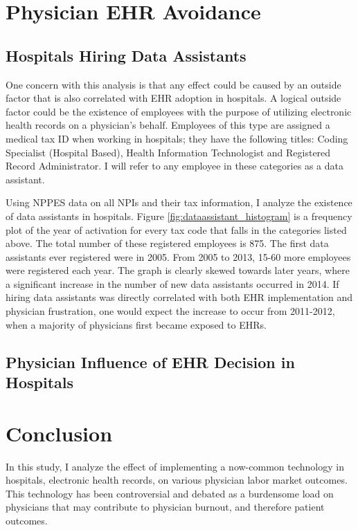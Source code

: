 \documentclass[11pt]{article}
\begin{document}
\section{Physician EHR Avoidance}

\subsection{Hospitals Hiring Data Assistants}\label{sec:dataass}

One concern with this analysis is that any effect could be caused by an outside factor that is also correlated with EHR adoption in hospitals. A logical outside factor could be the existence of employees with the purpose of utilizing electronic health records on a physician's behalf. Employees of this type are assigned a medical tax ID when working in hospitals; they have the following titles: Coding Specialist (Hospital Based), Health Information Technologist and Registered Record Administrator. I will refer to any employee in these categories as a data assistant. 

Using NPPES data on all NPIs and their tax information, I analyze the existence of data assistants in hospitals. Figure \ref{fig:dataassistant_histogram} is a frequency plot of the year of activation for every tax code that falls in the categories listed above. The total number of these registered employees is 875. The first data assistants ever registered were in 2005. From 2005 to 2013, 15-60 more employees were registered each year. The graph is clearly skewed towards later years, where a significant increase in the number of new data assistants occurred in 2014. If hiring data assistants was directly correlated with both EHR implementation and physician frustration, one would expect the increase to occur from 2011-2012, when a majority of physicians first became exposed to EHRs. 

\subsection{Physician Influence of EHR Decision in Hospitals}


\section{Conclusion}

In this study, I analyze the effect of implementing a now-common technology in hospitals, electronic health records, on various physician labor market outcomes. This technology has been controversial and debated as a burdensome load on physicians that may contribute to physician burnout, and therefore patient outcomes. 
\end{document}
